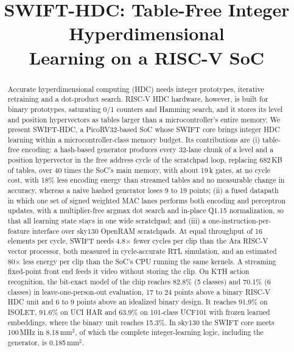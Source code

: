 \documentclass[conference]{IEEEtran}
\begin{document}
\title{SWIFT-HDC: Table-Free Integer Hyperdimensional\\ Learning on a RISC-V SoC}

\maketitle

\begin{abstract}
Accurate hyperdimensional computing (HDC) needs integer prototypes, iterative retraining and a dot-product search. RISC-V HDC hardware, however, is built for binary prototypes, saturating 0/1 counters and Hamming search, and it stores its level and position hypervectors as tables larger than a microcontroller's entire memory. We present SWIFT-HDC, a PicoRV32-based SoC whose SWIFT core brings integer HDC learning within a microcontroller-class memory budget. Its contributions are (i) table-free encoding: a hash-based generator produces every 32-lane chunk of a level and a position hypervector in the free address cycle of the scratchpad loop, replacing 682\,KB of tables, over 40 times the SoC's main memory, with about 19\,k gates, at no cycle cost, with 18\% less encoding energy than streamed tables and no measurable change in accuracy, whereas a naive hashed generator loses 9 to 19 points; (ii) a fused datapath in which one set of signed weighted MAC lanes performs both encoding and perceptron updates, with a multiplier-free argmax dot search and in-place Q1.15 normalization, so that all learning state stays in one wide scratchpad; and (iii) a one-instruction-per-feature interface over sky130 OpenRAM scratchpads. At equal throughput of 16 elements per cycle, SWIFT needs 4.8$\times$ fewer cycles per clip than the Ara RISC-V vector processor, both measured in cycle-accurate RTL simulation, and an estimated 80$\times$ less energy per clip than the SoC's CPU running the same kernels. A streaming fixed-point front end feeds it video without storing the clip. On KTH action recognition, the bit-exact model of the chip reaches 82.8\% (5 classes) and 70.1\% (6 classes) in leave-one-person-out evaluation, 17 to 24 points above a binary RISC-V HDC unit and 6 to 9 points above an idealized binary design. It reaches 91.9\% on ISOLET, 91.6\% on UCI HAR and 63.9\% on 101-class UCF101 with frozen learned embeddings, where the binary unit reaches 15.3\%. In sky130 the SWIFT core meets 100\,MHz in 8.18\,mm$^2$, of which the complete integer-learning logic, including the generator, is 0.185\,mm$^2$.
\end{abstract}
\end{document}

